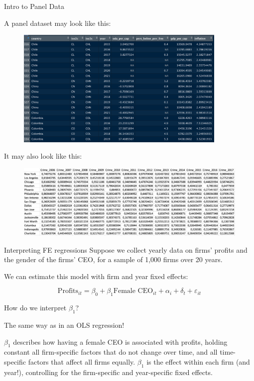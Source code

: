 \documentclass[11pt,xcolor=table]{beamer}
\begin{document}
\begin{frame}[allowframebreaks]{Intro to Panel Data}

A panel dataset may look like this:

\begin{figure}
\includegraphics[width=0.9\textwidth]{figures/panel_long.png}
\end{figure}

\framebreak 

It may also look like this: 
\begin{figure}
\includegraphics[width=1.0\textwidth]{figures/panel_wide.png}
\end{figure}
\end{frame}






\begin{frame}{Interpreting FE regressions}
Suppose we collect yearly data on firms' profits and the gender of the firms' CEO, for a sample of 1,000 firms over 20 years.

We can estimate this model with firm and year fixed effects:

$$ \text{Profits}_{i t}=\beta_0+\beta_1 \text{Female CEO}_{i t}+\alpha_i+\delta_t + \varepsilon_{i t} $$

How do we interpret $\beta_1$?

\pause 
The same way as in an OLS regression!

$\beta_1$ describes how having a female CEO is associated with profits, holding constant all firm-specific factors that do not change over time, and all time-specific factors that affect all firms equally.  $\beta_1$ is the effect within each firm (and year!), controlling for the firm-specific and year-specific fixed effects.


\end{frame}
\end{document}
